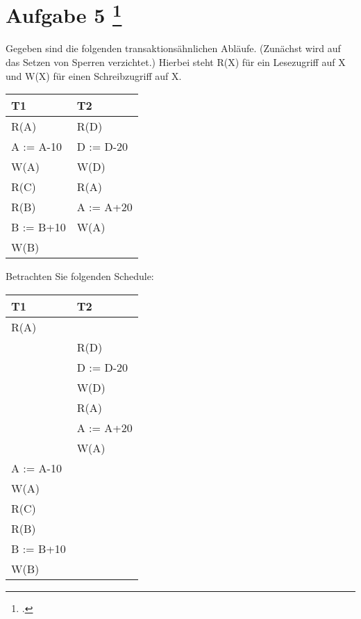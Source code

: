 \documentclass{lehramt-informatik-aufgabe}
\begin{document}
\liAufgabenTitel{}
\section{Aufgabe 5
\footcite{examen:66116:2021:03}}

Gegeben sind die folgenden transaktionsähnlichen Abläufe. (Zunächst wird
auf das Setzen von Sperren verzichtet.) Hierbei steht R(X) für ein
Lesezugriff auf X und W(X) für einen Schreibzugriff auf X.

\begin{center}
\begin{tabular}{|l|l|}
\hline
T1 & T2 \\\hline
R(A) & R(D) \\
A := A-10 & D := D-20 \\
W(A) & W(D) \\
R(C)   & R(A) \\
R(B) & A := A+20 \\
B := B+10 & W(A) \\
W(B)      &
\\\hline
\end{tabular}
\end{center}

\noindent
Betrachten Sie folgenden Schedule:

\begin{center}
\begin{tabular}{|l|l|}
\hline
T1 & T2 \\\hline

R(A) & \\

& R(D) \\
& D := D-20 \\
& W(D) \\
& R(A) \\
& A := A+20 \\
& W(A) \\

A := A-10 & \\
W(A) & \\
R(C) & \\
R(B) & \\
B := B+10 & \\
W(B) & \\\hline
\end{tabular}
\end{center}
\end{document}
